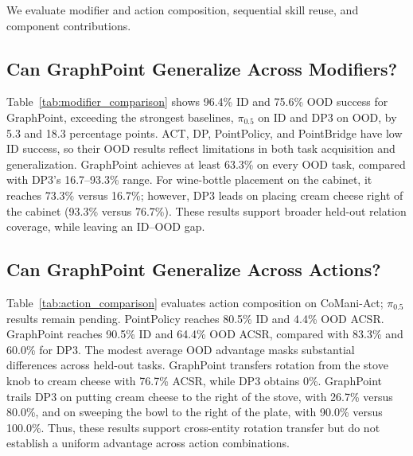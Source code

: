 We evaluate modifier and action composition, sequential skill reuse, and component contributions.

\subsection{Can GraphPoint Generalize Across Modifiers?}
Table~\ref{tab:modifier_comparison} shows 96.4\% ID and 75.6\% OOD success for GraphPoint, exceeding the strongest baselines, $\pi_{0.5}$ on ID and DP3 on OOD, by 5.3 and 18.3 percentage points.
ACT, DP, PointPolicy, and PointBridge have low ID success, so their OOD results reflect limitations in both task acquisition and generalization.
GraphPoint achieves at least 63.3\% on every OOD task, compared with DP3's 16.7--93.3\% range.
For wine-bottle placement on the cabinet, it reaches 73.3\% versus 16.7\%; however, DP3 leads on placing cream cheese right of the cabinet (93.3\% versus 76.7\%).
These results support broader held-out relation coverage, while leaving an ID--OOD gap.

\subsection{Can GraphPoint Generalize Across Actions?}
Table~\ref{tab:action_comparison} evaluates action composition on CoMani-Act; $\pi_{0.5}$ results remain pending. PointPolicy reaches 80.5\% ID and 4.4\% OOD ACSR.
GraphPoint reaches 90.5\% ID and 64.4\% OOD ACSR, compared with 83.3\% and 60.0\% for DP3.
The modest average OOD advantage masks substantial differences across held-out tasks.
GraphPoint transfers rotation from the stove knob to cream cheese with 76.7\% ACSR, while DP3 obtains 0\%.
GraphPoint trails DP3 on putting cream cheese to the right of the stove, with 26.7\% versus 80.0\%, and on sweeping the bowl to the right of the plate, with 90.0\% versus 100.0\%.
Thus, these results support cross-entity rotation transfer but do not establish a uniform advantage across action combinations.

